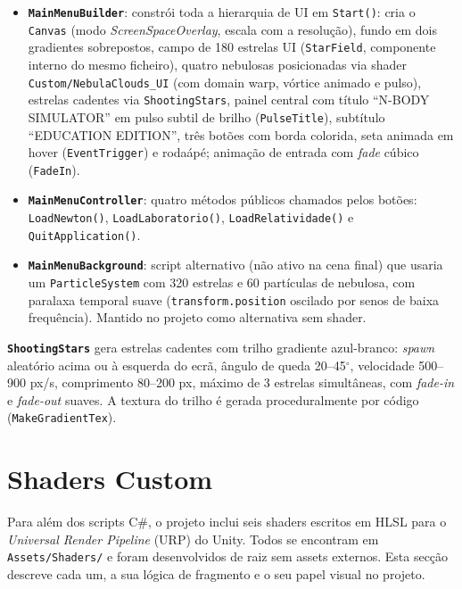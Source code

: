 \documentclass[12pt,a4paper]{article}
\begin{document}
\begin{itemize}
  \item \textbf{\texttt{MainMenuBuilder}}: constr\'{o}i toda a hierarquia de UI em \texttt{Start()}: cria o \texttt{Canvas} (modo \textit{ScreenSpaceOverlay}, escala com a resolu\c{c}\~{a}o), fundo em dois gradientes sobrepostos, campo de 180 estrelas UI (\texttt{StarField}, componente interno do mesmo ficheiro), quatro nebulosas posicionadas via shader \texttt{Custom/NebulaClouds\_UI} (com domain warp, v\'{o}rtice animado e pulso), estrelas cadentes via \texttt{ShootingStars}, painel central com t\'{i}tulo ``N-BODY SIMULATOR'' em pulso subtil de brilho (\texttt{PulseTitle}), subt\'{i}tulo ``EDUCATION EDITION'', tr\^{e}s bot\~{o}es com borda colorida, seta animada em hover (\texttt{EventTrigger}) e roda\'{a}p\'{e}; anima\c{c}\~{a}o de entrada com \textit{fade} c\'{u}bico (\texttt{FadeIn}).
  
  \item \textbf{\texttt{MainMenuController}}: quatro m\'{e}todos p\'{u}blicos chamados pelos bot\~{o}es: \texttt{LoadNewton()}, \texttt{LoadLaboratorio()}, \texttt{LoadRelatividade()} e \texttt{QuitApplication()}.
  
  \item \textbf{\texttt{MainMenuBackground}}: script alternativo (n\~{a}o ativo na cena final) que usaria um \texttt{ParticleSystem} com 320 estrelas e 60 part\'{i}culas de nebulosa, com paralaxa temporal suave (\texttt{transform.position} oscilado por senos de baixa frequ\^{e}ncia). Mantido no projeto como alternativa sem shader.
\end{itemize}

\textbf{\texttt{ShootingStars}} gera estrelas cadentes com trilho gradiente azul-branco: \textit{spawn} aleat\'{o}rio acima ou \`{a} esquerda do ecr\~{a}, \^{a}ngulo de queda 20--45$^{\circ}$, velocidade 500--900 px/s, comprimento 80--200 px, m\'{a}ximo de 3 estrelas simult\^{a}neas, com \textit{fade-in} e \textit{fade-out} suaves. A textura do trilho \'{e} gerada proceduralmente por c\'{o}digo (\texttt{MakeGradientTex}).

\section{Shaders Custom}

Para al\'{e}m dos scripts C\#, o projeto inclui seis shaders escritos em HLSL para o \textit{Universal Render Pipeline} (URP) do Unity. Todos se encontram em \texttt{Assets/Shaders/} e foram desenvolvidos de raiz sem assets externos. Esta sec\c{c}\~{a}o descreve cada um, a sua l\'{o}gica de fragmento e o seu papel visual no projeto.
\end{document}
